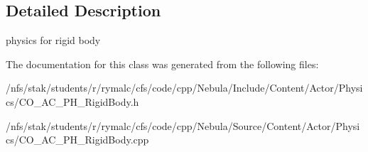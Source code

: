 \subsection{Detailed Description}
physics for rigid body 

The documentation for this class was generated from the following files:\begin{DoxyCompactItemize}
\item 
/nfs/stak/students/r/rymalc/cfs/code/cpp/Nebula/Include/Content/Actor/Physics/CO\_\-AC\_\-PH\_\-RigidBody.h\item 
/nfs/stak/students/r/rymalc/cfs/code/cpp/Nebula/Source/Content/Actor/Physics/CO\_\-AC\_\-PH\_\-RigidBody.cpp\end{DoxyCompactItemize}
